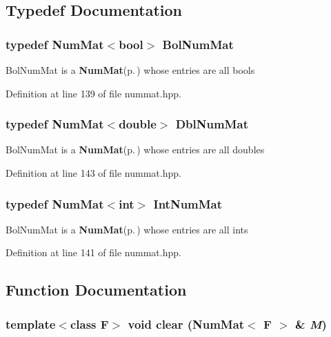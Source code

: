 \subsection{Typedef Documentation}
\subsubsection{\setlength{\rightskip}{0pt plus 5cm}typedef {\bf Num\-Mat}$<$bool$>$ {\bf Bol\-Num\-Mat}}\label{nummat_8hpp_8c54e8636c83b13a7a2dd58b38d03bad_8c54e8636c83b13a7a2dd58b38d03bad}


Bol\-Num\-Mat is a {\bf Num\-Mat}{\rm (p.\,\pageref{classNumMat})} whose entries are all bools 

Definition at line 139 of file nummat.hpp.
\subsubsection{\setlength{\rightskip}{0pt plus 5cm}typedef {\bf Num\-Mat}$<$double$>$ {\bf Dbl\-Num\-Mat}}\label{nummat_8hpp_18ed51e81f911a23442591467d7a83ca_18ed51e81f911a23442591467d7a83ca}


Bol\-Num\-Mat is a {\bf Num\-Mat}{\rm (p.\,\pageref{classNumMat})} whose entries are all doubles 

Definition at line 143 of file nummat.hpp.
\subsubsection{\setlength{\rightskip}{0pt plus 5cm}typedef {\bf Num\-Mat}$<$int$>$ {\bf Int\-Num\-Mat}}\label{nummat_8hpp_89be19e57084d8db87343f10003f03b5_89be19e57084d8db87343f10003f03b5}


Bol\-Num\-Mat is a {\bf Num\-Mat}{\rm (p.\,\pageref{classNumMat})} whose entries are all ints 

Definition at line 141 of file nummat.hpp.

\subsection{Function Documentation}
\subsubsection{\setlength{\rightskip}{0pt plus 5cm}template$<$class F$>$ void clear ({\bf Num\-Mat}$<$ F $>$ \& {\em M})\hspace{0.3cm}{\tt  [inline]}}\label{nummat_8hpp_fbcd982c57f29b050cc5e159366e7539_fbcd982c57f29b050cc5e159366e7539}


